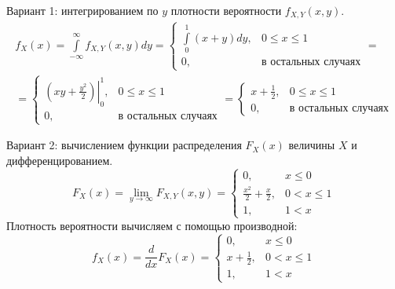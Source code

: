 \begin{enumerate}
    Вариант 1: интегрированием по $y$ плотности вероятности $f_{X,Y}(x,y)$.
    \begin{multline}
        f_X(x)
        = \int \limits_{-\infty}^{\infty} f_{X,Y}(x,y) dy
        =
        \left \{
        \begin{array}{ll}
            \int \limits_0^1 (x + y) dy, & 0 \le x \le 1              \\
            0,                           & \text{в остальных случаях}
        \end{array}
        \right . = \\
%
        =
        \left \{
        \begin{array}{ll}
            \left . \left ( x y + \frac{y^2}{2} \right ) \right |_0^1, & 0 \le x \le 1              \\
            0,                                                         & \text{в остальных случаях}
        \end{array}
        \right .
        =
        \left \{
        \begin{array}{ll}
            x + \frac{1}{2}, & 0 \le x \le 1              \\
            0,               & \text{в остальных случаях}
        \end{array}
        \right .
    \end{multline}

    Вариант 2: вычислением функции распределения $F_X(x)$ величины $X$ и дифференцированием.
    \begin{equation}
        F_X(x)
        = \lim_{y \rightarrow \infty} F_{X,Y}(x,y)
        = \left \{
        \begin{array}{ll}
            0,                           & x \le 0     \\
            \frac{x^2}{2} + \frac{x}{2}, & 0 < x \le 1 \\
            1,                           & 1 < x
        \end{array}
        \right .
    \end{equation}
    Плотность вероятности вычисляем с помощью производной:
    \begin{equation}
        f_X(x)
        = \frac{d}{dx} F_X(x)
        = \left \{
        \begin{array}{ll}
            0,               & x \le 0     \\
            x + \frac{1}{2}, & 0 < x \le 1 \\
            1,               & 1 < x
        \end{array}
        \right .
    \end{equation}


\end{enumerate}
